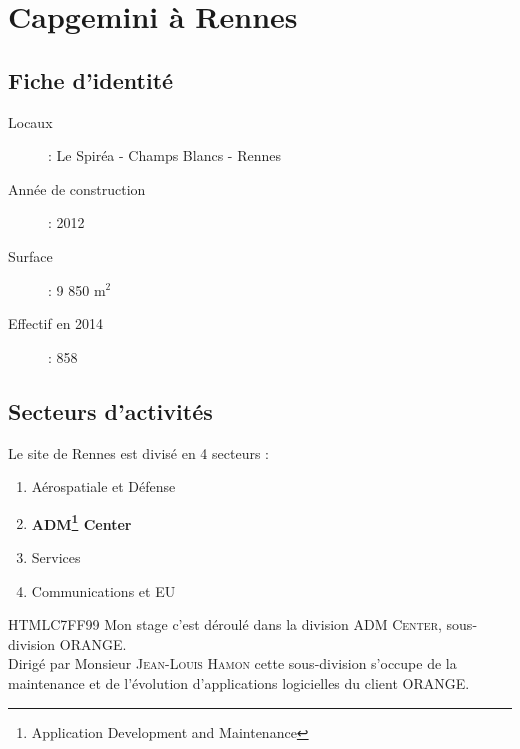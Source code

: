\chapter{Capgemini à Rennes}
\section{Fiche d'identité}
\begin{description}
  \item[Locaux] : Le Spiréa - Champs Blancs - Rennes
  \item[Année de construction] : 2012
  \item[Surface] : 9 850 m$^2$
  \item[Effectif en 2014] : 858
\end{description}
\begin{figure}[h]
\end{figure}
\newpage
\section{Secteurs d'activités}
Le site de Rennes est divisé en 4 secteurs :
\begin{enumerate}
\item Aérospatiale et Défense
\item \textbf{ADM\footnote{Application Development and Maintenance} Center}
\item Services
\item Communications et EU\\
\end{enumerate}

\begin{colbox}{{HTML}{C7FF99}}{}
  Mon stage c'est déroulé dans la division \textsc{ADM Center}, sous-division ORANGE.\\
  Dirigé par Monsieur \textsc{Jean-Louis Hamon}
  cette sous-division s'occupe de la maintenance et de l'évolution d'applications logicielles du client ORANGE.
\end{colbox}

